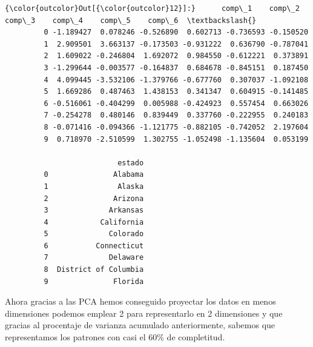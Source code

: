 \documentclass[11pt]{article}
\begin{document}
\begin{Verbatim}[commandchars=\\\{\}]
{\color{outcolor}Out[{\color{outcolor}12}]:}      comp\_1    comp\_2    comp\_3    comp\_4    comp\_5    comp\_6  \textbackslash{}
         0 -1.189427  0.078246 -0.526890  0.602713 -0.736593 -0.150520   
         1  2.909501  3.663137 -0.173503 -0.931222  0.636790 -0.787041   
         2  1.609022 -0.246804  1.692072  0.984550 -0.612221  0.373891   
         3 -1.299644 -0.003577 -0.164837  0.684678 -0.845151  0.187450   
         4  4.099445 -3.532106 -1.379766 -0.677760  0.307037 -1.092108   
         5  1.669286  0.487463  1.438153  0.341347  0.604915 -0.141485   
         6 -0.516061 -0.404299  0.005988 -0.424923  0.557454  0.663026   
         7 -0.254278  0.480146  0.839449  0.337760 -0.222955  0.240183   
         8 -0.071416 -0.094366 -1.121775 -0.882105 -0.742052  2.197604   
         9  0.718970 -2.510599  1.302755 -1.052498 -1.135604  0.053199   
         
                          estado  
         0               Alabama  
         1                Alaska  
         2               Arizona  
         3              Arkansas  
         4            California  
         5              Colorado  
         6           Connecticut  
         7              Delaware  
         8  District of Columbia  
         9               Florida  
\end{Verbatim}
            
    Ahora gracias a las PCA hemos conseguido proyectar los datos en menos
dimensiones podemos emplear 2 para representarlo en 2 dimensiones y que
gracias al procentaje de varianza acumulado anteriormente, sabemos que
representamos los patrones con casi el 60\% de completitud.
\end{document}
